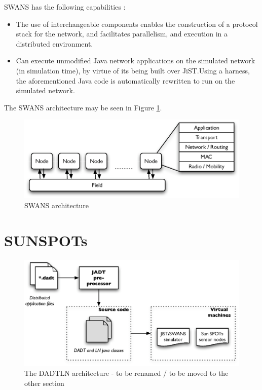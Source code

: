 SWANS has the following capabilities \cite{barr_SWANS}:

\begin{itemize}
\item The use of
interchangeable components enables the construction of a protocol stack for the
network, and facilitates parallelism, and execution in a distributed environment.
\item Can execute unmodified Java network applications on the
simulated network (in simulation time), by virtue of its being built over
JiST.Using a harness, the aforementioned Java code is automatically rewritten to
run on the simulated network.  
\end{itemize}
   
The SWANS architecture may be seen in Figure \ref{Fig:SWANS_architecture}. 

\begin{figure}[ht]
\centering
\label{Fig:SWANS_architecture}
\includegraphics[scale=0.71]{img/SWANS_architecture.eps} \caption[SWANS 
architecture]{SWANS architecture}
\end{figure} 

\section {SUNSPOTs}	
 
  
\begin{figure}[ht]
\centering
\label{Fig:DADTLN_architecture}
\includegraphics[scale=0.71]{img/DADTLN_architecture.eps} \caption[The DADTLn 
architecture - to be renamed]{The DADTLN architecture - to be renamed / to be
moved to the other section}
\end{figure} 
